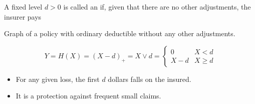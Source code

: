 \documentclass[notoc,notitlepage]{tufte-book}
\begin{document}
\begin{defn}\label{defn:ordinary_deductible}
  A fixed level $d > 0$ is called an  if, given that there are no other adjustments, the insurer pays
  \begin{marginfigure}
    \caption{Graph of a policy with ordinary deductible without any other adjustments.}\label{fig:graph_of_a_policy_with_ordinary_deductible_without_any_other_adjustments}
  \end{marginfigure}
  \begin{equation*}
    Y = H(X) = {(X - d)}_+ = X \lor d = \begin{cases}
      0     & X < d \\
      X - d & X \geq d
    \end{cases}
  \end{equation*}
\end{defn}

\begin{note}
  \begin{itemize}
    \item For any given loss, the first $d$ dollars falls on the insured.
    \item It is a protection against frequent small claims.
  \end{itemize}
\end{note}
\end{document}
